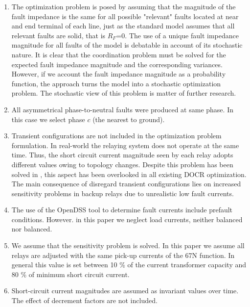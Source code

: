 \documentclass[letterpaper, 10 pt, conference]{IEEEtran}
\begin{document}
\begin{enumerate}

\item The optimization problem is posed by assuming that the magnitude of the fault impedance is the same for all possible "relevant" faults located at near and end terminal of each line, just as the standard model \cite{urdaneta1988} assumes that all relevant faults are solid, that is $R_F$=0. The use of a unique fault impedance magnitude for all faults of the model is debatable in account of its stochastic nature. It is clear that the coordination problem must be solved for the expected fault impedance magnitude and the corresponding variances. However, if we account the fault impedance magnitude as a probability function, the approach turns the model into a stochastic optimization problem. The stochastic view of this problem is matter of further research.


\item All asymmetrical phase-to-neutral faults were produced at same phase. In this case we select phase $c$ (the nearest to ground).

\item Transient configurations are not included in the optimization problem formulation. In real-world the relaying system does not operate at the same time. Thus, the short circuit current magnitude seen by each relay adopts different values owing to topology changes. Despite this problem has been solved in \cite{urdaneta1997optimal,sorrentino2020novel}, this aspect has been overlooked in all existing DOCR optimization. The main consequence of disregard transient configurations lies on increased sensitivity problems in backup relays due to unrealistic low fault currents.

   \item The use of the OpenDSS tool to determine fault currents include prefault conditions. However. in this paper we neglect load currents, neither balanced nor balanced.

   \item We assume that the sensitivity problem is solved. In this paper we assume all relays are adjusted with the same pick-up currents of the 67N function. In general this value is set between 10 \% of the current transformer capacity and 80 \% of minimum short circuit current.

  \item Short-circuit current magnitudes are assumed as invariant values over time. The effect of decrement factors are not included.


\end{enumerate}
\end{document}
